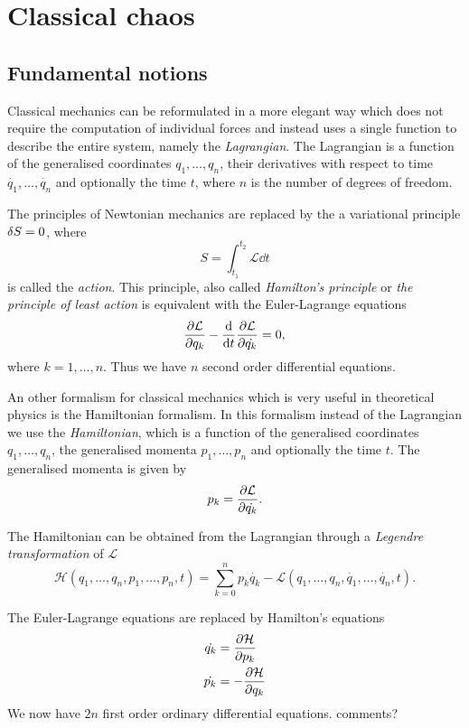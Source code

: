\documentclass[../thesis.tex]{subfiles}
\begin{document}
\chapter{Classical chaos}

\section{Fundamental notions}

Classical mechanics can be reformulated in a more elegant way which does not
require the computation of individual forces and instead uses a single function to
describe the entire system, namely the \emph{Lagrangian}.
The Lagrangian is a function of the generalised coordinates \(q_1, \dotsc, q_n\),
their derivatives with respect to time \(\dot{q_1}, \dotsc, \dot{q_n}\)
and optionally the time \(t\), where \(n\) is the number of degrees of freedom.

The principles of Newtonian mechanics are replaced by the a variational principle
\(\var{S} = 0\), where
\begin{equation}
  \label{eq:action}
  S = \int_{t_1}^{t_2} \mathcal{L} \dd{t}
\end{equation}
is called the \emph{action}.
This principle, also called \emph{Hamilton's principle} or \emph{the principle of least action}
is equivalent with the Euler-Lagrange equations
\[
  \pdv{\mathcal{L}}{q_k} - \dv{t}\pdv{\mathcal{L}}{\dot{q_k}} = 0,
\]
where \(k=1,\dotsc, n\).
Thus we have \(n\) second order differential equations.

An other formalism for classical mechanics which is very useful in theoretical physics is
the Hamiltonian formalism. In this formalism instead of the \mbox{Lagrangian} we use the
\emph{Hamiltonian}, which is a function of the generalised coordinates \(q_1, \dotsc, q_n\),
the generalised momenta \(p_1, \dotsc, p_n\) and optionally the time \(t\).
The generalised momenta is given by
\[
  p_k = \pdv{\mathcal{L}}{\dot{q_k}}.
\]

The Hamiltonian can be obtained from the Lagrangian through a \emph{Legendre transformation} of
\(\mathcal{L}\)
\begin{equation}
  \label{eq:legendre-tr}
  \mathcal{H}(q_1, \dotsc, q_n, p_1, \dotsc, p_n, t)
  = \sum_{k=0}^n p_k\dot{q_k} - \mathcal{L}(q_1, \dotsc, q_n, \dot{q_1}, \dotsc, \dot{q_n}, t).
\end{equation}

The Euler-Lagrange equations are replaced by Hamilton's equations
\begin{align*}
  \dot{q_k} &= \pdv{\mathcal{H}}{p_k} \\
  \dot{p_k} &= -\pdv{\mathcal{H}}{q_k}
\end{align*}
We now have \(2n\) first order ordinary differential equations. {\color{red}comments?}
\end{document}
